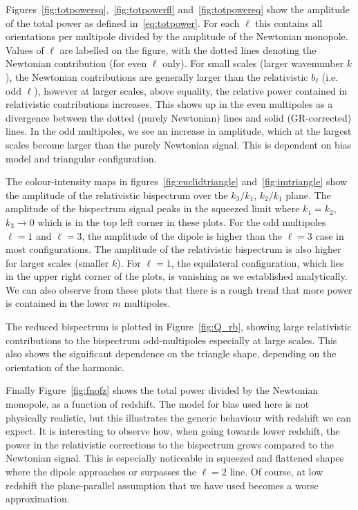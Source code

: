 {Figures~\ref{fig:totpowersq},~\ref{fig:totpowerfl} and~\ref{fig:totpowereq} show the amplitude of the total power as defined in~\eqref{eq:totpower}. For each $\ell$ this contains all orientations per multipole divided by the amplitude of the Newtonian monopole. Values of \(\ell\) are labelled on the figure, with the dotted lines denoting the Newtonian contribution (for even \(\ell\) only). For small scales (larger wavenumber \(k\)), the Newtonian contributions are generally larger than the relativistic \(b_\ell\) (i.e. odd \(\ell\)), however at larger scales,  above equality, the relative power contained in relativistic contributions increases. This shows up in the even multipoles as a divergence between the dotted (purely Newtonian) lines and solid (GR-corrected) lines. In the odd multipoles, we see an increase in amplitude, which at the largest scales become larger than the purely Newtonian signal. This is dependent on bias model and triangular configuration.

The colour-intensity maps in figures~\ref{fig:euclidtriangle} and~\ref{fig:imtriangle} show the amplitude of the relativistic bispectrum over the \(k_3/k_1\), \(k_2/k_1\) plane. The amplitude of the bispectrum signal peaks in the squeezed limit where \(k_1=k_2\), \(k_3\to 0\) which is in the top left corner in these plots. For the odd multipoles \(\ell = 1\) and \(\ell = 3\),  the amplitude of the dipole is higher than the \(\ell=3\) case in most configurations. The amplitude of the relativistic bispectrum is also higher for larger scales (smaller \(k\)). For \(\ell = 1\), the equilateral configuration, which lies in the upper right corner of the plots, is vanishing as we established analytically. 
We can also observe from these plots that there is a rough trend that more power is contained in the lower $m$ multipoles.

The reduced bispectrum is plotted in Figure~\ref{fig:Q_rb}, showing large relativistic contributions to the bispectrum odd-multipoles especially at large scales. This also shows the significant dependence on the triangle shape, depending on the orientation of the harmonic.  

Finally Figure~\ref{fig:fnofz} shows the total power divided by the Newtonian monopole, as a function of redshift. The model for bias used here is not physically realistic, but this illustrates the generic behaviour with redshift we can expect. It is interesting to observe how, when going towards lower redshift, the power in the relativistic corrections to the bispectrum grows compared to the Newtonian signal. This is especially noticeable in squeezed and flattened shapes where the dipole approaches or surpasses the \(\ell = 2\) line. Of course, at low redshift the plane-parallel assumption that we have used becomes a worse approximation.

}
